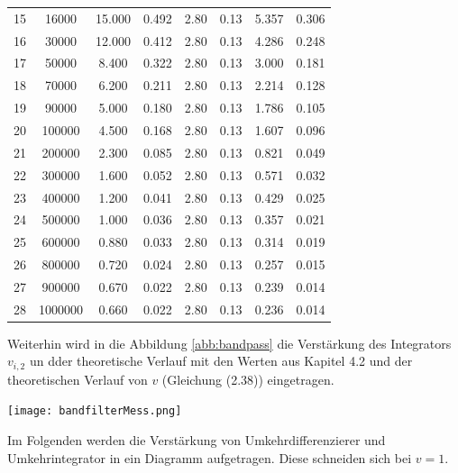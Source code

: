 \begin{center}
\begin{tabular}{l | c c c c c | c c}
        15 & 16000   & 15.000  & 0.492       & 2.80    & 0.13        & 5.357 & 0.306 \\
        16 & 30000   & 12.000  & 0.412       & 2.80    & 0.13        & 4.286 & 0.248 \\
        17 & 50000   & 8.400   & 0.322       & 2.80    & 0.13        & 3.000 & 0.181 \\
        18 & 70000   & 6.200   & 0.211       & 2.80    & 0.13        & 2.214 & 0.128 \\
        19 & 90000   & 5.000   & 0.180       & 2.80    & 0.13        & 1.786 & 0.105 \\
        20 & 100000  & 4.500   & 0.168       & 2.80    & 0.13        & 1.607 & 0.096 \\
        21 & 200000  & 2.300   & 0.085       & 2.80    & 0.13        & 0.821 & 0.049 \\
        22 & 300000  & 1.600   & 0.052       & 2.80    & 0.13        & 0.571 & 0.032 \\
        23 & 400000  & 1.200   & 0.041       & 2.80    & 0.13        & 0.429 & 0.025 \\
        24 & 500000  & 1.000   & 0.036       & 2.80    & 0.13        & 0.357 & 0.021 \\
        25 & 600000  & 0.880   & 0.033       & 2.80    & 0.13        & 0.314 & 0.019 \\
        26 & 800000  & 0.720   & 0.024       & 2.80    & 0.13        & 0.257 & 0.015 \\
        27 & 900000  & 0.670   & 0.022       & 2.80    & 0.13        & 0.239 & 0.014 \\
        28 & 1000000 & 0.660   & 0.022       & 2.80    & 0.13        & 0.236 & 0.014 \\
    \end{tabular}
    \label{tab:bandpass}
\end{center}
Weiterhin wird in die Abbildung \ref{abb:bandpass} die Verstärkung des Integrators $v_{i,2}$ un dder theoretische Verlauf mit den Werten aus Kapitel 4.2 und der theoretischen Verlauf von $v$ (Gleichung (2.38)) eingetragen.
\newpage
\begin{center}
    \texttt{[image: bandfilterMess.png]}
    \label{abb:bandpass}
\end{center}
\newpage
Im Folgenden werden die Verstärkung von Umkehrdifferenzierer und Umkehrintegrator in ein Diagramm aufgetragen. Diese schneiden sich bei $v = 1$.\\
